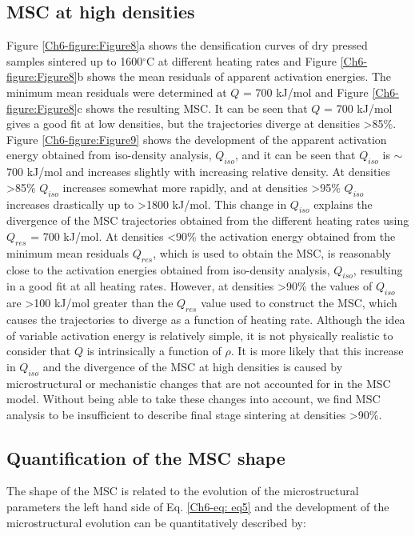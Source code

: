 \subsection{MSC at high densities}
Figure \ref{Ch6-figure:Figure8}a shows the densification curves of dry pressed samples sintered up to 1600$^{\circ}$C at different heating rates and Figure \ref{Ch6-figure:Figure8}b shows the mean residuals of apparent activation energies. The minimum mean residuals were determined at $Q$ = 700 kJ/mol and Figure \ref{Ch6-figure:Figure8}c shows the resulting MSC. It can be seen that $Q$ = 700 kJ/mol gives a good fit at low densities, but the trajectories diverge at densities >85\%. Figure \ref{Ch6-figure:Figure9} shows the development of the apparent activation energy obtained from iso-density analysis, $Q_{iso}$, and it can be seen that $Q_{iso}$ is $\sim$700 kJ/mol and increases slightly with increasing relative density. At densities >85\% $Q_{iso}$ increases somewhat more rapidly, and at densities >95\% $Q_{iso}$ increases drastically up to >1800 kJ/mol. This change in $Q_{iso}$ explains the divergence of the MSC trajectories obtained from the different heating rates using $Q_{res}$ = 700 kJ/mol. At densities <90\% the activation energy obtained from the minimum mean residuals $Q_{res}$, which is used to obtain the MSC, is reasonably close to the activation energies obtained from iso-density analysis, $Q_{iso}$, resulting in a good fit at all heating rates. However, at densities >90\% the values of $Q_{iso}$ are >100 kJ/mol greater than the $Q_{res}$ value used to construct the MSC, which causes the trajectories to diverge as a function of heating rate. Although the idea of variable activation energy is relatively simple, it is not physically realistic to consider that $Q$ is intrinsically a function of $\rho$. It is more likely that this increase in $Q_{iso}$ and the divergence of the MSC at high densities is caused by microstructural or mechanistic changes that are not accounted for in the MSC model. Without being able to take these changes into account, we find MSC analysis to be insufficient to describe final stage sintering at densities >90\%.

\subsection{Quantification of the MSC shape}
The shape of the MSC is related to the evolution of the microstructural parameters the left hand side of Eq. \ref{Ch6-eq: eq5} and the development of the microstructural evolution can be quantitatively described by:

